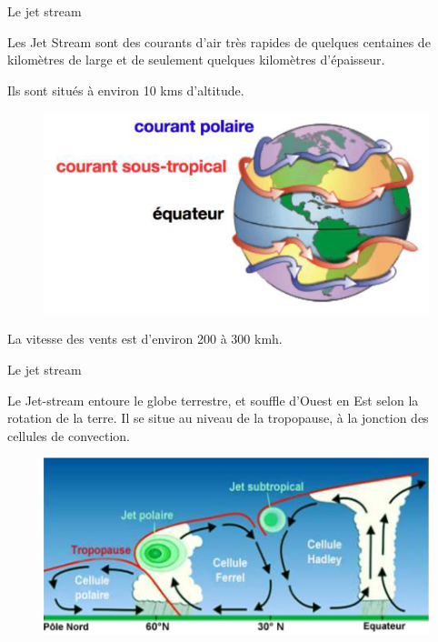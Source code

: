 \documentclass{beamer}
\begin{document}
\begin{frame}{Le jet stream}

  Les Jet Stream sont des courants d'air très rapides de quelques
  centaines de kilomètres de large et de seulement quelques kilomètres
  d'épaisseur.

  \pause

  Ils sont situés à environ 10 kms d'altitude.

  \pause
  
  \begin{figure}
    \centering
    \includegraphics[scale=1]{images/jet-stream2.png}
  \end{figure}

  \pause

  La vitesse des vents est d'environ 200 à 300 kmh.
  
\end{frame}

\begin{frame}{Le jet stream}

  Le Jet-stream entoure le globe terrestre, et souffle d’Ouest en Est
  selon la rotation de la terre. Il se situe au niveau de la
  tropopause, à la jonction des cellules de convection.
  
  \begin{figure}
    \centering
    \includegraphics[scale=1]{images/jet-stream1.png}
  \end{figure}
\end{frame}
\end{document}
